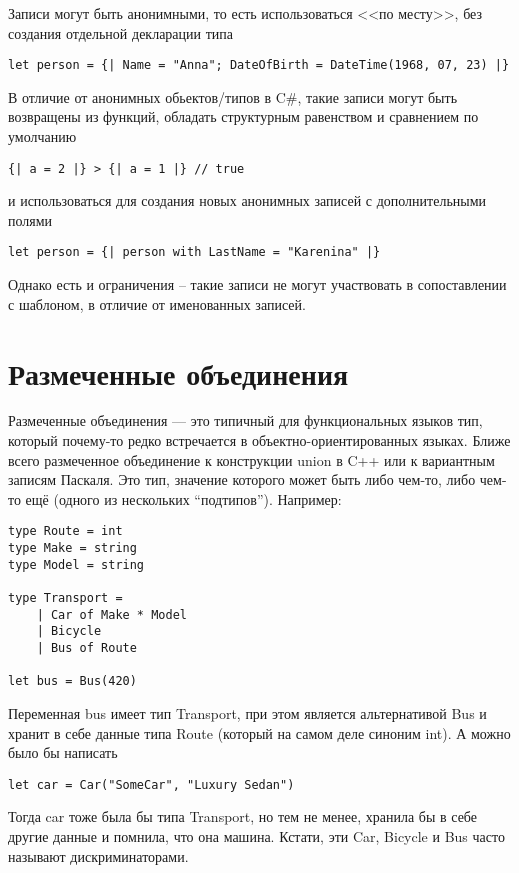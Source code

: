 \documentclass[a5paper]{article}
\begin{document}
Записи могут быть анонимными, то есть использоваться <<по месту>>, без создания отдельной декларации типа
        \begin{verbatim}
let person = {| Name = "Anna"; DateOfBirth = DateTime(1968, 07, 23) |}
        \end{verbatim}
В отличие от анонимных обьектов/типов в C\#, такие записи могут быть возвращены из функций, обладать структурным равенством и сравнением по умолчанию
\begin{verbatim}
{| a = 2 |} > {| a = 1 |} // true
\end{verbatim}
и использоваться для создания новых анонимных записей с дополнительными полями
\begin{verbatim}
let person = {| person with LastName = "Karenina" |}
\end{verbatim}
Однако есть и ограничения -- такие записи не могут участвовать в сопоставлении с шаблоном, в отличие от именованных записей.

\section{Размеченные объединения}

Размеченные объединения --- это типичный для функциональных языков тип, который почему-то редко встречается в объектно-ориентированных языках. Ближе всего размеченное объединение к конструкции union в C++ или к вариантным записям Паскаля. Это тип, значение которого может быть либо чем-то, либо чем-то ещё (одного из нескольких ``подтипов''). Например:

\begin{verbatim}
type Route = int
type Make = string
type Model = string

type Transport =
    | Car of Make * Model
    | Bicycle
    | Bus of Route

let bus = Bus(420)
\end{verbatim}

Переменная bus имеет тип Transport, при этом является альтернативой Bus и хранит в себе данные типа Route (который на самом деле синоним int). А можно было бы написать

\begin{verbatim}
let car = Car("SomeCar", "Luxury Sedan")
\end{verbatim}

Тогда car тоже была бы типа Transport, но тем не менее, хранила бы в себе другие данные и помнила, что она машина. Кстати, эти Car, Bicycle и Bus часто называют дискриминаторами.
\end{document}
